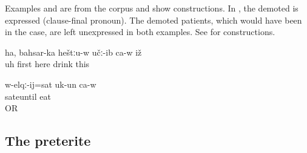 Examples  and  are from the corpus and show  constructions. In , the demoted  is expressed (clause-final pronoun). The demoted patients, which would have been in the  case, are left unexpressed in both examples. See  for  constructions.
%
\begin{exe}
	\ex	\label{ex:Uh, first he drank here analytic}
	\gll	ha,	bahsar-ka	heštːu-w	učː-ib	ca-w	iž\\
		uh	first	here	 drink		this\\
	\glt	{}

	\ex	\label{ex:He ate until he was full analytic}
	\gll	w-elqː-ij=sat	uk-un	ca-w\\
		sateuntil	eat	\\
	\glt	{} OR 
\end{exe}



\subsection{The preterite}
\label{ssec:The preterite}

